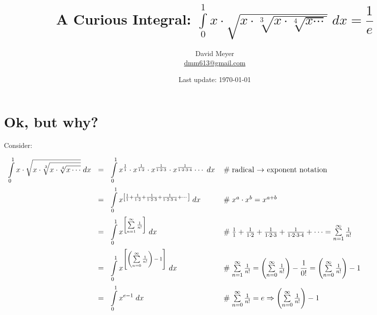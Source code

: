\documentclass{article}
\title{A Curious Integral: ${\displaystyle \int\limits_{0}^{1} x \cdot 
	   		\sqrt{x \cdot \sqrt[3]{x \cdot \sqrt[4]{x \cdots}}}} \; dx = \dfrac{1}{e}$}
\author{David Meyer \\ \href{mailto:dmm613@gmail.com}
                            {dmm613@gmail.com}}
\date{Last update: \today}
\theoremstyle{definition}
\begin{document}
\maketitle
%
%
%
\section{Ok, but why?}
\label{sec:introduction}

{\Large Consider:}

\begin{center}
      \begin{math}								%
      \fontsize{11.25}{8}
	   \begin{array}{llll}						%
	       {\displaystyle \int\limits_{0}^{1} x \cdot 
	   		\sqrt{x \cdot \sqrt[3]{x \cdot \sqrt[4]{x \cdots}}}} \; dx
	   &=& {\displaystyle \int\limits_{0}^{1} x^{\frac{1}{1}} \cdot x^{\frac{1}{1 \cdot 2}} \cdot 
	   		x^{\frac{1}{1 \cdot 2 \cdot 3}} \cdot x^{\frac{1}{1 \cdot 2 \cdot 3 \cdot 4}}}
			\cdots \; dx
			&\hspace{0.25em} \mathrel{\#} \text{radical $\rightarrow$ exponent notation} \\
[18pt]
		&=& {\displaystyle \int\limits_{0}^{1} x^{\left [ \frac{1}{1} + \frac{1}{1 \cdot 2} + 
	   		\frac{1}{1 \cdot 2 \cdot 3} + \frac{1}{1 \cdot 2 \cdot 3 \cdot 4} + 
			\cdots \right ]}} \; dx
			&\hspace{0.25em} \mathrel{\#} x^a \cdot x^b = x^{a+b} \\
[18pt]
		&=& {\displaystyle \int\limits_{0}^{1} x^{\left [\sum\limits_{n=1}^{\infty} \frac{1}{n!} \right ]} \; dx}
			&\hspace{0.25em} \mathrel{\#} \frac{1}{1} +\frac{1}{1\cdot 2} + \frac{1}{1\cdot 2 \cdot 3} + 
			\frac{1}{1 \cdot 2\cdot3\cdot 4} + \cdots = 
			\sum\limits_{n=1}^{\infty} \frac{1}{n!} \\
[18pt]
		&=& {\displaystyle \int\limits_{0}^{1} x^{\left [ \left ( \sum\limits_{n=0}^{\infty} \frac{1}{n!} \right ) 
											\, - \, 1 \right ]} \; dx}
			&\hspace{0.25em} \mathrel{\#} \sum\limits_{n=1}^{\infty} \frac{1}{n!} = 
											\left (\sum\limits _{n=0}^{\infty} \frac{1}{n!} \right ) - \dfrac{1}{0!} =
											\left (\sum\limits _{n=0}^{\infty} \frac{1}{n!} \right ) - 1\\
[18pt]
		&=& {\displaystyle \int\limits_{0}^{1} x^{e-1}} \; dx
			&\hspace{0.25em} \mathrel{\#}  \sum\limits _{n=0}^{\infty} \frac{1}{n!} = e  
											\Rightarrow \left (\sum\limits _{n=0}^{\infty} \frac{1}{n!} \right ) - 1 

\end{array}
\end{math}
\end{center}
\end{document}

